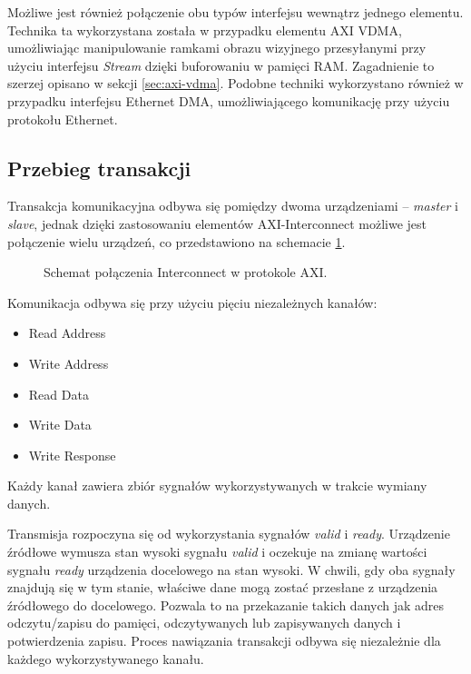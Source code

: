 Możliwe jest również połączenie obu typów interfejsu wewnątrz jednego elementu. Technika ta wykorzystana została w przypadku elementu AXI VDMA, umożliwiając manipulowanie ramkami obrazu wizyjnego przesyłanymi przy użyciu interfejsu \emph{Stream} dzięki buforowaniu w pamięci RAM. Zagadnienie to szerzej opisano w sekcji \ref{sec:axi-vdma}. Podobne techniki wykorzystano również w przypadku interfejsu Ethernet DMA, umożliwiającego komunikację przy użyciu protokołu Ethernet.

\subsection{Przebieg transakcji}

Transakcja komunikacyjna odbywa się pomiędzy dwoma urządzeniami -- \emph{master} i \emph{slave}, jednak dzięki zastosowaniu elementów AXI-Interconnect możliwe jest połączenie wielu urządzeń, co przedstawiono na schemacie \ref{fig:axi-interconnect}.

\begin{figure}[h]
	\centering
	\def\svgwidth{8cm}
	
	\caption{Schemat połączenia Interconnect w protokole AXI.}
	\label{fig:axi-interconnect}
\end{figure}


Komunikacja odbywa się przy użyciu pięciu niezależnych kanałów:
\begin{itemize}
	\item Read Address
	\item Write Address
	\item Read Data
	\item Write Data
	\item Write Response
\end{itemize}

Każdy kanał zawiera zbiór sygnałów wykorzystywanych w trakcie wymiany danych.

Transmisja rozpoczyna się od wykorzystania sygnałów \emph{valid} i \emph{ready}. Urządzenie źródłowe wymusza stan wysoki sygnału \emph{valid} i oczekuje na zmianę wartości sygnału \emph{ready} urządzenia docelowego na stan wysoki. W chwili, gdy oba sygnały znajdują się w tym stanie, właściwe dane mogą zostać przesłane z urządzenia źródłowego do docelowego. Pozwala to na przekazanie takich danych jak adres odczytu/zapisu do pamięci, odczytywanych lub zapisywanych danych i potwierdzenia zapisu. Proces nawiązania transakcji odbywa się niezależnie dla każdego wykorzystywanego kanału.

